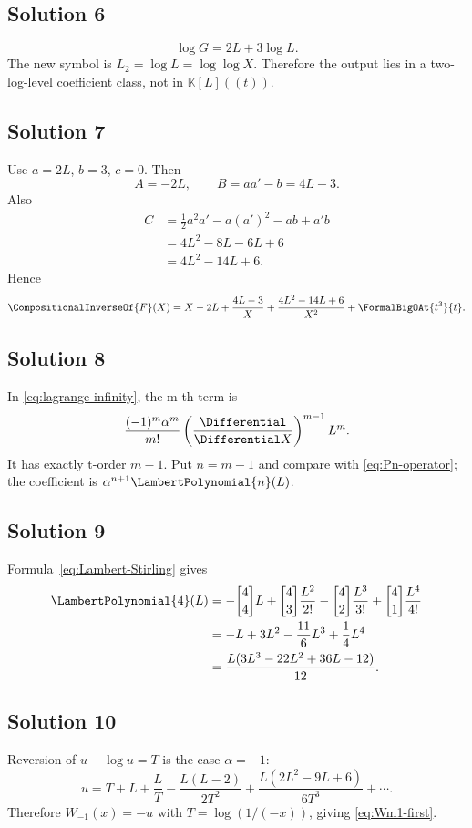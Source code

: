\documentclass[11pt,openany]{book}
\theoremstyle{definition}
\theoremstyle{plain}
\theoremstyle{remark}
\newcommand{\K}{\mathbb{K}}
\newcommand{\rev}[1]{\CompositionalInverseOf{#1}}
\newcommand{\stirlingone}[2]{\genfrac{[}{]}{0pt}{}{#1}{#2}}
\begin{document}
\subsection*{Solution 6}
\[
 \log G=2L+3\log L.
\]
The new symbol is \(L_2=\log L=\log\log X\).  Therefore the output lies in a
two-log-level coefficient class, not in \(\K[L]((t))\).

\subsection*{Solution 7}
Use \(a=2L\), \(b=3\), \(c=0\).  Then
\[
 A=-2L,
 \qquad
 B=aa'-b=4L-3.
\]
Also
\begin{align*}
 C&=\frac12a^2a'-a(a')^2-ab+a'b\\
 &=4L^2-8L-6L+6\\
 &=4L^2-14L+6.
\end{align*}
Hence
\[
 \rev F(X)=X-2L+\frac{4L-3}{X}
 +\frac{4L^2-14L+6}{X^2}+\FormalBigOAt{t^3}{t}.
\]

\subsection*{Solution 8}
In \cref{eq:lagrange-infinity}, the m-th term is
\[
 \frac{(-1)^m\alpha^m}{m!}
 \left(\frac{\Differential}{\Differential X}\right)^{m-1}L^m.
\]
It has exactly t-order \(m-1\).  Put \(n=m-1\) and compare with
\cref{eq:Pn-operator}; the coefficient is \(\alpha^{n+1}\LambertPolynomial{n}(L)\).

\subsection*{Solution 9}
Formula~\eqref{eq:Lambert-Stirling} gives
\begin{align*}
 \LambertPolynomial{4}(L)
 &=-\stirlingone{4}{4}L
 +\stirlingone{4}{3}\frac{L^2}{2!}
 -\stirlingone{4}{2}\frac{L^3}{3!}
 +\stirlingone{4}{1}\frac{L^4}{4!}\\
 &=-L+3L^2-\frac{11}{6}L^3+\frac14L^4\\
 &=\frac{L(3L^3-22L^2+36L-12)}{12}.
\end{align*}

\subsection*{Solution 10}
Reversion of \(u-\log u=T\) is the case \(\alpha=-1\):
\[
 u=T+L+\frac{L}{T}-\frac{L(L-2)}{2T^2}
 +\frac{L(2L^2-9L+6)}{6T^3}+\cdots.
\]
Therefore \(W_{-1}(x)=-u\) with
\(T=\log(1/(-x))\), giving \cref{eq:Wm1-first}.
\end{document}
